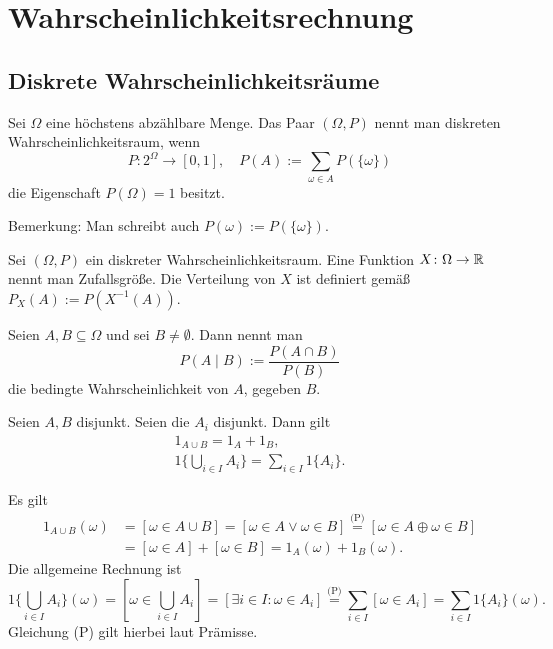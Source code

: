 
\chapter{Wahrscheinlichkeitsrechnung}

\section{Diskrete Wahrscheinlichkeitsräume}

\begin{Definition}%
\label{def:discrete-prob-space}\newlinefirst
Sei $\Omega$ eine höchstens abzählbare Menge. Das
Paar $(\Omega,P)$ nennt man diskreten Wahrscheinlichkeitsraum,
wenn
\[P\colon 2^\Omega\to [0,1],\quad P(A):=\sum_{\omega\in A} P(\{\omega\})\]
die Eigenschaft $P(\Omega) = 1$ besitzt.
\end{Definition}
Bemerkung: Man schreibt auch $P(\omega):=P(\{\omega\})$.

\begin{Definition}%
\newlinefirst
Sei $(\Omega,P)$ ein diskreter Wahrscheinlichkeitsraum.
Eine Funktion $X\colon\Omega\to\mathbb R$ nennt man Zufallsgröße.
Die Verteilung von $X$ ist definiert gemäß $P_X(A):=P(X^{-1}(A))$.
\end{Definition}

\begin{Definition}%
\newlinefirst
Seien $A,B\subseteq\Omega$ und sei $B\ne\emptyset$. Dann nennt man
\[P(A\mid B) := \frac{P(A\cap B)}{P(B)}\]
die bedingte Wahrscheinlichkeit von $A$, gegeben $B$.
\end{Definition}

\begin{Lemma}\label{indicator-disjoint}
Seien $A,B$ disjunkt. Seien die $A_i$ disjunkt. Dann gilt
\begin{gather*}
1_{A\cup B} = 1_A + 1_B,\\
1\{\bigcup_{i\in I} A_i\} = \sum_{i\in I} 1\{A_i\}.
\end{gather*}
\end{Lemma}
\begin{Beweis}
Es gilt
\begin{align*}
1_{A\cup B}(\omega) &= [\omega\in A\cup B]
= [\omega\in A\lor\omega\in B]
\stackrel{\text{(P)}}= [\omega\in A\oplus\omega\in B]\\
&= [\omega\in A] + [\omega\in B] = 1_A(\omega) + 1_B(\omega).
\end{align*}
Die allgemeine Rechnung ist
\[1\{\bigcup_{i\in I} A_i\}(\omega) = [\omega\in\bigcup_{i\in I} A_i]
= [\exists i\in I\colon \omega\in A_i]
\stackrel{\text{(P)}}= \sum_{i\in I} [\omega\in A_i]
= \sum_{i\in I} 1\{A_i\}(\omega).\]
Gleichung (P) gilt hierbei laut Prämisse.\,\qedsymbol
\end{Beweis}

